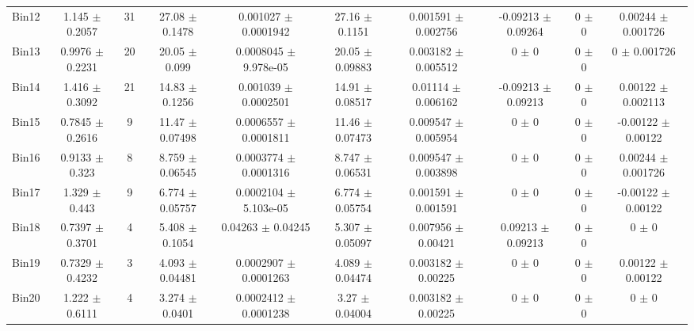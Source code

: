 \begin{tabular}{@{\extracolsep{4pt}}lccccccccc@{}}
     Bin12 & 1.145 $\pm$ 0.2057 & 31 & 27.08 $\pm$ 0.1478 & 0.001027 $\pm$ 0.0001942 & 27.16 $\pm$ 0.1151 & 0.001591 $\pm$ 0.002756 & -0.09213 $\pm$ 0.09264 & 0 $\pm$ 0 & 0.00244 $\pm$ 0.001726 \\ 
     Bin13 & 0.9976 $\pm$ 0.2231 & 20 & 20.05 $\pm$ 0.099 & 0.0008045 $\pm$ 9.978e-05 & 20.05 $\pm$ 0.09883 & 0.003182 $\pm$ 0.005512 & 0 $\pm$ 0 & 0 $\pm$ 0 & 0 $\pm$ 0.001726 \\ 
     Bin14 & 1.416 $\pm$ 0.3092 & 21 & 14.83 $\pm$ 0.1256 & 0.001039 $\pm$ 0.0002501 & 14.91 $\pm$ 0.08517 & 0.01114 $\pm$ 0.006162 & -0.09213 $\pm$ 0.09213 & 0 $\pm$ 0 & 0.00122 $\pm$ 0.002113 \\ 
     Bin15 & 0.7845 $\pm$ 0.2616 & 9 & 11.47 $\pm$ 0.07498 & 0.0006557 $\pm$ 0.0001811 & 11.46 $\pm$ 0.07473 & 0.009547 $\pm$ 0.005954 & 0 $\pm$ 0 & 0 $\pm$ 0 & -0.00122 $\pm$ 0.00122 \\ 
     Bin16 & 0.9133 $\pm$ 0.323 & 8 & 8.759 $\pm$ 0.06545 & 0.0003774 $\pm$ 0.0001316 & 8.747 $\pm$ 0.06531 & 0.009547 $\pm$ 0.003898 & 0 $\pm$ 0 & 0 $\pm$ 0 & 0.00244 $\pm$ 0.001726 \\ 
     Bin17 & 1.329 $\pm$ 0.443 & 9 & 6.774 $\pm$ 0.05757 & 0.0002104 $\pm$ 5.103e-05 & 6.774 $\pm$ 0.05754 & 0.001591 $\pm$ 0.001591 & 0 $\pm$ 0 & 0 $\pm$ 0 & -0.00122 $\pm$ 0.00122 \\ 
     Bin18 & 0.7397 $\pm$ 0.3701 & 4 & 5.408 $\pm$ 0.1054 & 0.04263 $\pm$ 0.04245 & 5.307 $\pm$ 0.05097 & 0.007956 $\pm$ 0.00421 & 0.09213 $\pm$ 0.09213 & 0 $\pm$ 0 & 0 $\pm$ 0 \\ 
     Bin19 & 0.7329 $\pm$ 0.4232 & 3 & 4.093 $\pm$ 0.04481 & 0.0002907 $\pm$ 0.0001263 & 4.089 $\pm$ 0.04474 & 0.003182 $\pm$ 0.00225 & 0 $\pm$ 0 & 0 $\pm$ 0 & 0.00122 $\pm$ 0.00122 \\ 
     Bin20 & 1.222 $\pm$ 0.6111 & 4 & 3.274 $\pm$ 0.0401 & 0.0002412 $\pm$ 0.0001238 & 3.27 $\pm$ 0.04004 & 0.003182 $\pm$ 0.00225 & 0 $\pm$ 0 & 0 $\pm$ 0 & 0 $\pm$ 0 \\ 
\hline\hline
  \end{tabular}
